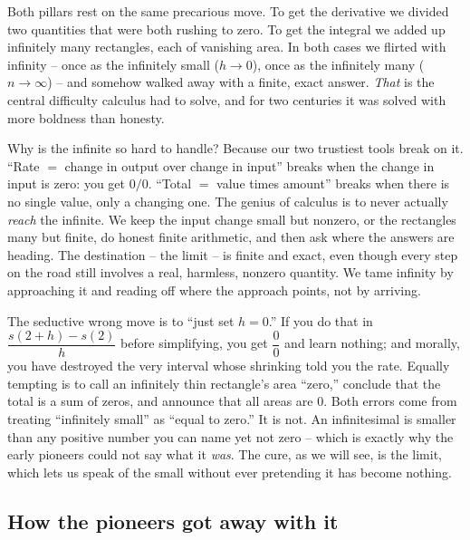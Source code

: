 Both pillars rest on the same precarious move. To get the derivative we divided
two quantities that were both rushing to zero. To get the integral we added up
infinitely many rectangles, each of vanishing area. In both cases we flirted
with infinity -- once as the infinitely small ($h \to 0$), once as the
infinitely many ($n \to \infty$) -- and somehow walked away with a finite, exact
answer. \emph{That} is the central difficulty calculus had to solve, and for two
centuries it was solved with more boldness than honesty.

\begin{intuitionbox}
Why is the infinite so hard to handle? Because our two trustiest tools break on
it. ``Rate $=$ change in output over change in input'' breaks when the change in
input is zero: you get $0/0$. ``Total $=$ value times amount'' breaks when there
is no single value, only a changing one. The genius of calculus is to never
actually \emph{reach} the infinite. We keep the input change small but nonzero,
or the rectangles many but finite, do honest finite arithmetic, and then ask
where the answers are heading. The destination -- the limit -- is finite and
exact, even though every step on the road still involves a real, harmless,
nonzero quantity. We tame infinity by approaching it and reading off where the
approach points, not by arriving.
\end{intuitionbox}

\begin{trapbox}
The seductive wrong move is to ``just set $h = 0$.'' If you do that in
$\dfrac{s(2+h)-s(2)}{h}$ before simplifying, you get $\dfrac{0}{0}$ and learn
nothing; and morally, you have destroyed the very interval whose shrinking told
you the rate. Equally tempting is to call an infinitely thin rectangle's area
``zero,'' conclude that the total is a sum of zeros, and announce that all areas
are $0$. Both errors come from treating ``infinitely small'' as ``equal to
zero.'' It is not. An infinitesimal is smaller than any positive number you can
name yet not zero -- which is exactly why the early pioneers could not say what
it \emph{was}. The cure, as we will see, is the limit, which lets us speak of
the small without ever pretending it has become nothing.
\end{trapbox}

\subsection{How the pioneers got away with it}

